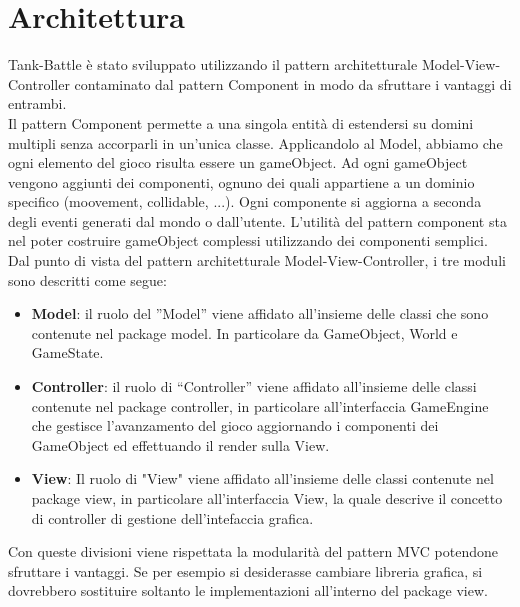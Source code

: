 \documentclass[a4paper,12pt]{report}
\begin{document}
\section{Architettura}
Tank-Battle è stato sviluppato utilizzando il pattern architetturale Model-View-Controller contaminato dal pattern Component in modo da sfruttare i vantaggi di entrambi.\\
Il pattern Component permette a una singola entità di estendersi su domini multipli senza accorparli in un’unica classe. Applicandolo al Model, abbiamo che ogni elemento del gioco risulta essere un gameObject. Ad ogni gameObject vengono aggiunti dei componenti, ognuno dei quali appartiene a un dominio specifico (moovement, collidable, ...). Ogni componente si aggiorna a seconda degli eventi generati dal mondo o dall’utente. L'utilità del pattern component sta nel poter costruire gameObject complessi utilizzando dei componenti semplici.\\
Dal punto di vista del pattern architetturale Model-View-Controller, i tre moduli sono descritti come segue: 
\begin{itemize}
	\item \textbf{Model}:
	il ruolo del ”Model” viene affidato all’insieme delle classi che sono contenute nel package model. In particolare da GameObject, World e GameState.
	\item \textbf{Controller}:
	il ruolo di “Controller” viene affidato all’insieme delle classi contenute nel package controller, in particolare all'interfaccia GameEngine che gestisce l’avanzamento del gioco aggiornando i componenti dei GameObject ed effettuando il render sulla View.
	\item \textbf{View}:
	Il ruolo di "View" viene affidato all’insieme delle classi contenute nel package view, in particolare all’interfaccia View, la quale descrive il concetto di controller di gestione dell'intefaccia grafica.
\end{itemize}
\newpage Con queste divisioni viene rispettata la modularità del pattern MVC potendone sfruttare i vantaggi. Se per esempio si desiderasse cambiare libreria grafica, si dovrebbero sostituire soltanto le implementazioni all’interno del package view.
	
\end{document}
